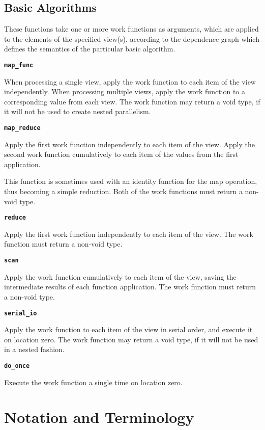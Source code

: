 \documentclass{report}
\begin{document}
\subsection{Basic Algorithms}

These functions take one or more work functions as arguments,
which are applied to the elements of the specified view(s),
according to the dependence graph which defines the semantics
of the particular basic algorithm.

\texttt{{\bf map\_func }}

When processing a single view, apply the work function to each
item of the view independently.  When processing multiple views,
apply the work function to a corresponding value from each view.
The work function may return a void type, if it will not be used
to create nested parallelism.

\texttt{{\bf map\_reduce }}

Apply the first work function independently to each item of the view.
Apply the second work function cumulatively to each item of the values from
the first application.

This function is sometimes used with an identity function for
the map operation, thus becoming a simple reduction.
Both of the work functions must return a non-void type.

\texttt{{\bf reduce }}

Apply the first work function independently to each item of the view.
The work function must return a non-void type.

\texttt{{\bf scan }}

Apply the work function cumulatively to each item of the view,
saving the intermediate results of each function application.
The work function must return a non-void type.

\texttt{{\bf serial\_io }}

Apply the work function to each item of the view in serial order,
and execute it on location zero.
The work function may return a void type, if it will not be used
in a nested fashion.

\texttt{{\bf do\_once }}

Execute the work function a single time on location zero.


\section{Notation and Terminology}
\end{document}
